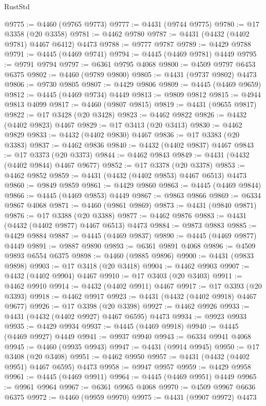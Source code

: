 \begin{lexlean}{RustStd}
\begin{coremodule}
@9775 := @4460 (@9765 @9773)
@9777 := @4431 (@9744 @9775)
@9780 := @17 @3358 (@20 @3358)
@9781 := @4462 @9780
@9787 := @4431 (@4432 (@4402 @9781) @4467 @6412) @4473
@9788 := @9777 @9787
@9789 := @4429 @9788
@9791 := @4445 (@4469 @9741)
@9794 := @4445 (@4469 @9781) @4449
@9795 := @9791 @9794
@9797 := @6361 @9795 @4068
@9800 := @4509 @9797 @6453 @6375
@9802 := @4460 (@9789 @9800)
@9805 := @4431 (@9737 @9802) @4473
@9806 := @9730 @9805
@9807 := @4429 @9806
@9809 := @4445 (@4469 @9659)
@9812 := @4445 (@4469 @9734) @4449
@9813 := @9809 @9812
@9815 := @4944 @9813 @4099
@9817 := @4460 (@9807 @9815)
@9819 := @4431 (@9655 @9817)
@9822 := @17 @3428 (@20 @3428)
@9823 := @4462 @9822
@9826 := @4432 (@4402 @9823) @4467
@9829 := @17 @3413 (@20 @3413)
@9830 := @4462 @9829
@9833 := @4432 (@4402 @9830) @4467
@9836 := @17 @3383 (@20 @3383)
@9837 := @4462 @9836
@9840 := @4432 (@4402 @9837) @4467
@9843 := @17 @3373 (@20 @3373)
@9844 := @4462 @9843
@9849 := @4431 (@4432 (@4402 @9844) @4467 @9677)
@9852 := @17 @3378 (@20 @3378)
@9853 := @4462 @9852
@9859 := @4431 (@4432 (@4402 @9853) @4467 @6513) @4473
@9860 := @9849 @9859
@9861 := @4429 @9860
@9863 := @4445 (@4469 @9844)
@9866 := @4445 (@4469 @9853) @4449
@9867 := @9863 @9866
@9869 := @6334 @9867 @4068
@9871 := @4460 (@9861 @9869)
@9873 := @4431 (@9840 @9871)
@9876 := @17 @3388 (@20 @3388)
@9877 := @4462 @9876
@9883 := @4431 (@4432 (@4402 @9877) @4467 @6513) @4473
@9884 := @9873 @9883
@9885 := @4429 @9884
@9887 := @4445 (@4469 @9837)
@9890 := @4445 (@4469 @9877) @4449
@9891 := @9887 @9890
@9893 := @6361 @9891 @4068
@9896 := @4509 @9893 @6554 @6375
@9898 := @4460 (@9885 @9896)
@9900 := @4431 (@9833 @9898)
@9903 := @17 @3418 (@20 @3418)
@9904 := @4462 @9903
@9907 := @4432 (@4402 @9904) @4467
@9910 := @17 @3403 (@20 @3403)
@9911 := @4462 @9910
@9914 := @4432 (@4402 @9911) @4467
@9917 := @17 @3393 (@20 @3393)
@9918 := @4462 @9917
@9923 := @4431 (@4432 (@4402 @9918) @4467 @9677)
@9926 := @17 @3398 (@20 @3398)
@9927 := @4462 @9926
@9933 := @4431 (@4432 (@4402 @9927) @4467 @6595) @4473
@9934 := @9923 @9933
@9935 := @4429 @9934
@9937 := @4445 (@4469 @9918)
@9940 := @4445 (@4469 @9927) @4449
@9941 := @9937 @9940
@9943 := @6334 @9941 @4068
@9945 := @4460 (@9935 @9943)
@9947 := @4431 (@9914 @9945)
@9950 := @17 @3408 (@20 @3408)
@9951 := @4462 @9950
@9957 := @4431 (@4432 (@4402 @9951) @4467 @6595) @4473
@9958 := @9947 @9957
@9959 := @4429 @9958
@9961 := @4445 (@4469 @9911)
@9964 := @4445 (@4469 @9951) @4449
@9965 := @9961 @9964
@9967 := @6361 @9965 @4068
@9970 := @4509 @9967 @6636 @6375
@9972 := @4460 (@9959 @9970)
@9975 := @4431 (@9907 @9972) @4473

\end{coremodule}
\end{lexlean}
